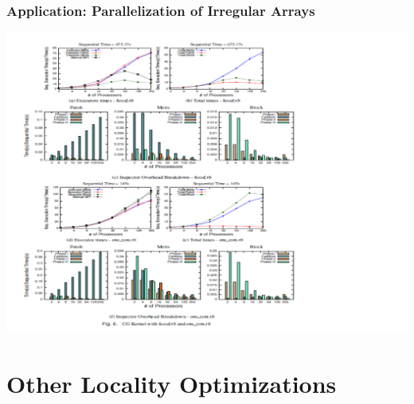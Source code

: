 \documentclass{beamer}
\begin{document}
\begin{frame}[fragile,t]
  \frametitle{Application: Parallelization of Irregular Arrays}

\center\includegraphics[width=59ex]{ParTeaserFigs/ParInspExec}

\end{frame}


\section{Other Locality Optimizations}

\begin{frame}[fragile]
	\tableofcontents[currentsection]
\end{frame}
\end{document}

